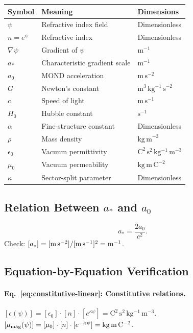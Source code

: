 \documentclass[11pt]{article}
\begin{document}
\begin{center}
\begin{tabular}{lll}
\toprule
\textbf{Symbol} & \textbf{Meaning} & \textbf{Dimensions} \\
\midrule
$\psi$ & Refractive index field & Dimensionless \\
$n = e^\psi$ & Refractive index & Dimensionless \\
$\nabla\psi$ & Gradient of $\psi$ & $\mathrm{m}^{-1}$ \\
$a_*$ & Characteristic gradient scale & $\mathrm{m}^{-1}$ \\
$a_0$ & MOND acceleration & $\mathrm{m\,s}^{-2}$ \\
$G$ & Newton's constant & $\mathrm{m^3\,kg^{-1}\,s^{-2}}$ \\
$c$ & Speed of light & $\mathrm{m\,s}^{-1}$ \\
$H_0$ & Hubble constant & $\mathrm{s}^{-1}$ \\
$\alpha$ & Fine-structure constant & Dimensionless \\
$\rho$ & Mass density & $\mathrm{kg\,m}^{-3}$ \\
$\epsilon_0$ & Vacuum permittivity & $\mathrm{C^2\,s^2\,kg^{-1}\,m^{-3}}$ \\
$\mu_0$ & Vacuum permeability & $\mathrm{kg\,m\,C^{-2}}$ \\
$\kappa$ & Sector-split parameter & Dimensionless \\
\bottomrule
\end{tabular}
\end{center}

\subsection{Relation Between $a_*$ and $a_0$}

\begin{equation}
a_* = \frac{2a_0}{c^2}.
\end{equation}
Check: $[a_*] = [\text{m\,s}^{-2}]/[\text{m\,s}^{-1}]^2 = \text{m}^{-1}$. \checkmark

\subsection{Equation-by-Equation Verification}

\paragraph{Eq.~\eqref{eq:constitutive-linear}: Constitutive relations.}
$[\epsilon(\psi)] = [\epsilon_0]\cdot[n]\cdot[e^{\kappa\psi}]
= \mathrm{C^2\,s^2\,kg^{-1}\,m^{-3}}$. \checkmark\\
$[\mu_{\rm mag}(\psi)] = [\mu_0]\cdot[n]\cdot[e^{-\kappa\psi}]
= \mathrm{kg\,m\,C^{-2}}$. \checkmark
\end{document}
